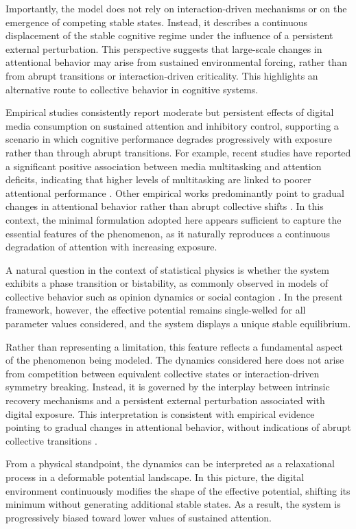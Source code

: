 \documentclass[preprint,12pt]{elsarticle}
\begin{document}
Importantly, the model does not rely on interaction-driven mechanisms or on the emergence of competing stable states. Instead, it describes a continuous displacement of the stable cognitive regime under the influence of a persistent external perturbation. This perspective suggests that large-scale changes in attentional behavior may arise from sustained environmental forcing, rather than from abrupt transitions or interaction-driven criticality. This highlights an alternative route to collective behavior in cognitive systems.


Empirical studies consistently report moderate but persistent effects of digital media consumption on sustained attention and inhibitory control, supporting a scenario in which cognitive performance degrades progressively with exposure rather than through abrupt transitions. For example, recent studies have reported a significant positive association between media multitasking and attention deficits, indicating that higher levels of multitasking are linked to poorer attentional performance \cite{chen}. Other empirical works predominantly point to gradual changes in attentional behavior rather than abrupt collective shifts \cite{Nguyen,Rioja}. In this context, the minimal formulation adopted here appears sufficient to capture the essential features of the phenomenon, as it naturally reproduces a continuous degradation of attention with increasing exposure.


A natural question in the context of statistical physics is whether the system exhibits a phase transition or bistability, as commonly observed in models of collective behavior such as opinion dynamics or social contagion \cite{rmp}. In the present framework, however, the effective potential remains single-welled for all parameter values considered, and the system displays a unique stable equilibrium.

Rather than representing a limitation, this feature reflects a fundamental aspect of the phenomenon being modeled. The dynamics considered here does not arise from competition between equivalent collective states or interaction-driven symmetry breaking. Instead, it is governed by the interplay between intrinsic recovery mechanisms and a persistent external perturbation associated with digital exposure. This interpretation is consistent with empirical evidence pointing to gradual changes in attentional behavior, without indications of abrupt collective transitions \cite{chen,Nguyen,Rioja}.


From a physical standpoint, the dynamics can be interpreted as a relaxational process in a deformable potential landscape. In this picture, the digital environment continuously modifies the shape of the effective potential, shifting its minimum without generating additional stable states. As a result, the system is progressively biased toward lower values of sustained attention.
\end{document}
